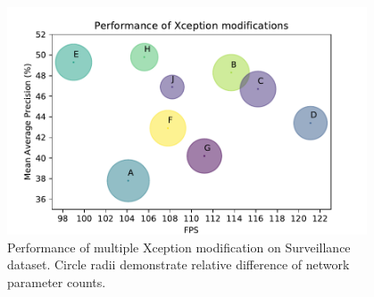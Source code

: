 \begin{figure}
    \centering
    \includegraphics[width=0.95\textwidth]{img/fps_map_x}
    \caption[Performance of multiple Xception modification on Surveillance dataset]{Performance of multiple Xception modification on Surveillance dataset. Circle radii demonstrate relative difference of network parameter counts.} 
    \label{fig:xception_perf}
\end{figure}

